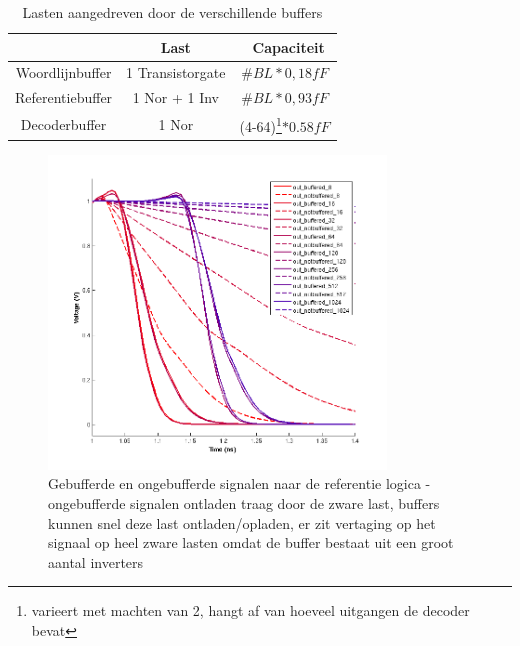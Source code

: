 \begin{table}
\begin{center}
\begin{tabular}{ccc}
\hline
 &  Last & \ Capaciteit\\
\hline
Woordlijnbuffer & 1 Transistorgate &  $\#BL*0,18fF$\\
Referentiebuffer & 1 Nor + 1 Inv &  $\#BL*0,93fF$\\
Decoderbuffer & 1 Nor & (4-64)\footnote{varieert met machten van 2, hangt af van hoeveel uitgangen de decoder bevat}$*0.58fF$\\
\hline
\end{tabular}
\end{center}
\caption[Lasten aangedreven door de verschillende buffers]{Lasten aangedreven door de verschillende buffers}
\label{tab:buffer}
\end{table}

\begin{figure}[!ht]
  \centering
  \includegraphics[width=0.8\textwidth]{../fig/hfdst-buffers-refbuffer.png}
  \caption[Gebufferde en ongebufferde signalen naar de referentie logica]{Gebufferde en ongebufferde signalen naar de referentie logica - ongebufferde signalen ontladen traag door de zware last, buffers kunnen snel deze last ontladen/opladen, er zit vertaging op het signaal op heel zware lasten omdat de buffer bestaat uit een groot aantal inverters}
  \label{fig:refbuffer}
\end{figure}

